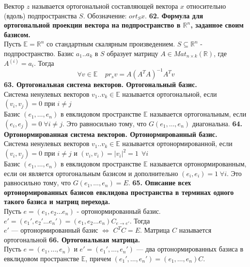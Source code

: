 \documentclass{article}
\begin{document}
Вектор $z$ называется ортогональной составляющей вектора $x$ относительно (вдоль) подпространства $S$. Обозначение: $ort_S x$.
\newline
\newline
\textbf{62. Формула для ортогональной проекции вектора на подпространство в $\mathbb{R}^n$, заданное своим базисом.}\\
Пусть $\mathbb{E}=\mathbb{R}^n$ со стандартным скалярным произведением. $S\subseteq \mathbb{R}^n$ - подпространство. Базис $a_1..a_k$ в $S$ образует матрицу $A\in Mat_{n \times k}(\mathbb{R})$, где $A^{(i)}=a_i$. Тогда
$$\forall v \in \mathbb{E}~~~~~pr_sv=A(A^TA)^{-1}A^Tv$$
\newline
\newline
\textbf{63. Ортогональная система векторов. Ортогональный базис.}\\
Система ненулевых векторов $v_1..v_k \in \mathbb{E}$ называется ортогональной, если $(v_i,v_j)=0$ при $i\neq j$\\ 
Базис $(e_1, \ldots, e_n)$ в евклидовом пространстве $\mathbb{E}$ называется ортогональным, если \\$(e_i, e_j)= 0\; \forall i\neq j$. Это равносильно тому, что $G(e_1, \ldots, e_n)$ диагональна.
\newline
\newline
\textbf{64. Ортонормированная система векторов. Ортонормированный базис.}\\
Система ненулевых векторов $v_1..v_k \in \mathbb{E}$ называется ортонормированной, если $(v_i,v_j)=0$ при $i\neq j$ и $(v_i,v_i)=|v_i|^2=1~~\forall i$\\
Базис $(e_1, \ldots, e_n)$ в евклидовом пространстве $\mathbb{E}$ называется ортонормированным, если он является ортогональным базисом и дополнительно $(e_i, e_i) = 1\; \forall i$. Это равносильно тому, что $G(e_1, \ldots, e_n) = E$.
\newpage
\textbf{65. Описание всех ортонормированных базисов евклидова пространства в терминах одного такого базиса и матриц перехода.}\\
Пусть $e=(e_1,e_2...e_n)$ - ортонормированный базис. $e'=(e_1',e_2'...e_n')=(e_1,e_2...e_n)C_{e\rightarrow e'}$. Тогда\\
$e'$ --- ортонормированный базис $\Leftrightarrow$ $C^TC=E$. Матрица $C$ называется ортогональной
\newline
\newline
\textbf{66. Ортогональная матрица.}\\
Пусть $e = (e_1, \ldots, e_n)$ и $e' = (e_1', \ldots, e_n')$ --- два ортонормированных базиса в евклидовом пространстве $\mathbb{E}$, причем $(e_1', \ldots, e_n') = (e_1, \ldots, e_n)C$. 
\end{document}
